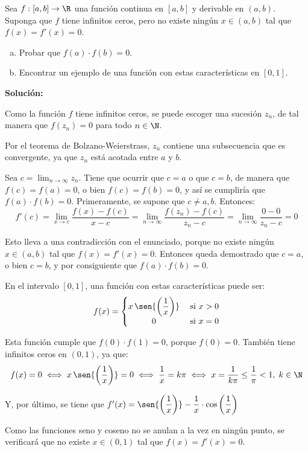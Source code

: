 \documentclass[../../main.tex]{subfiles}
\begin{document}
  \begin{shaded}
    Sea $f: [a, b] \to \R$ una función continua en $[a, b]$ y derivable en $(a, b)$. Suponga que $f$ tiene infinitos ceros, pero no existe ningún $x \in (a, b)$ tal que $f(x) = f'(x) = 0$.

    \begin{enumerate}[a)]
      \item Probar que $f(a) \cdot f(b) = 0$.
      \item Encontrar un ejemplo de una función con estas características en $[0, 1]$.
    \end{enumerate}

  \end{shaded}

  \textbf{Solución:}

  Como la función $f$ tiene infinitos ceros, se puede escoger una sucesión $z_n$, de tal manera que $f(z_n) = 0$ para todo $n \in \N$.

  Por el teorema de Bolzano-Weierstrass, $z_n$ contiene una subsecuencia que es convergente, ya que $z_n$ está acotada entre $a$ y $b$.

  Sea $c = \displaystyle\lim_{n \to \infty} z_n$. Tiene que ocurrir que $c = a$ o que $c = b$, de manera que $f(c) = f(a) = 0$, o bien $f(c) = f(b) = 0$, y así se cumpliría que $f(a) \cdot f(b) = 0$. Primeramente, se supone que $c \ne a, b$. Entonces:
  $$
  f'(c) = \displaystyle\lim_{x \to c} \displaystyle\frac{f(x) - f(c)}{x - c} = \displaystyle\lim_{n \to \infty} \displaystyle\frac{f(z_n) - f(c)}{z_n - c} = \displaystyle\lim_{n \to \infty} \displaystyle\frac{0 - 0}{z_n - c} = 0
  $$

  Esto lleva a una contradicción con el enunciado, porque no existe ningún $x \in (a, b)$ tal que $f(x) = f'(x) = 0$. Entonces queda demostrado que $c = a$, o bien $c = b$, y por consiguiente que $f(a) \cdot f(b) = 0$.

  En el intervalo $[0, 1]$, una función con estas características puede ser:
  $$
  f(x) = \left\{
    \begin{matrix}
      x \, \sen{\left(\displaystyle\frac{1}{x}\right)} & \; \text{si } x > 0 \\
      0 & \; \text{si } x = 0
    \end{matrix}
  \right .
  $$

  Esta función cumple que $f(0) \cdot f(1) = 0$, porque $f(0) = 0$. También tiene infinitos ceros en $(0, 1)$, ya que:
  $$
  f(x) = 0 \iff x \, \sen{\left(\frac{1}{x}\right)} = 0 \iff \frac{1}{x} = k\pi \iff x = \frac{1}{k\pi} \leq \frac{1}{\pi} < 1, \; k \in \N
  $$

  Y, por último, se tiene que $f'(x) = \sen{\left(\displaystyle\frac{1}{x}\right)} - \displaystyle\frac{1}{x} \cdot \cos{\left(\displaystyle\frac{1}{x}\right)}$

  Como las funciones seno y coseno no se anulan a la vez en ningún punto, se verificará que no existe $x \in (0, 1)$ tal que $f(x) = f'(x) = 0$.
\end{document}
